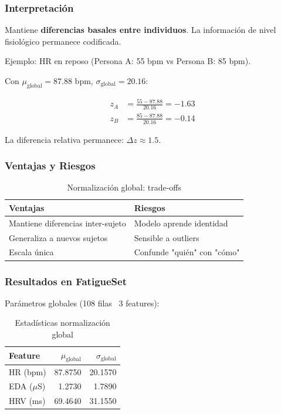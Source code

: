 \documentclass[11pt,twoside,a4paper]{article}
\begin{document}
\subsubsection{Interpretación}

Mantiene \textbf{diferencias basales entre individuos}. La información de nivel fisiológico permanece codificada.

Ejemplo: HR en reposo (Persona A: 55 bpm vs Persona B: 85 bpm).

Con $\mu_{\text{global}} = 87.88$ bpm, $\sigma_{\text{global}} = 20.16$:

\begin{align}
z_A &= \frac{55 - 87.88}{20.16} = -1.63 \\
z_B &= \frac{85 - 87.88}{20.16} = -0.14
\end{align}

La diferencia relativa permanece: $\Delta z \approx 1.5$.

\subsubsection{Ventajas y Riesgos}

\begin{table}[H]
\centering
\caption{Normalización global: trade-offs}
\label{tab:norm_global_trade}
\begin{tabular}{|l|l|}
\hline
\textbf{Ventajas} & \textbf{Riesgos} \\
\hline
Mantiene diferencias inter-sujeto & Modelo aprende identidad \\
\hline
Generaliza a nuevos sujetos & Sensible a outliers \\
\hline
Escala única & Confunde "quién" con "cómo" \\
\hline
\end{tabular}
\end{table}

\subsubsection{Resultados en FatigueSet}

Parámetros globales (108 filas \texttimes\ 3 features):

\begin{table}[H]
\centering
\caption{Estadísticas normalización global}
\label{tab:norm_global_params}
\begin{tabular}{|l|r|r|}
\hline
Feature & $\mu_{\text{global}}$ & $\sigma_{\text{global}}$ \\
\hline
HR (bpm) & 87.8750 & 20.1570 \\
\hline
EDA ($\mu$S) & 1.2730 & 1.7890 \\
\hline
HRV (ms) & 69.4640 & 31.1550 \\
\hline
\end{tabular}
\end{table}
\end{document}
